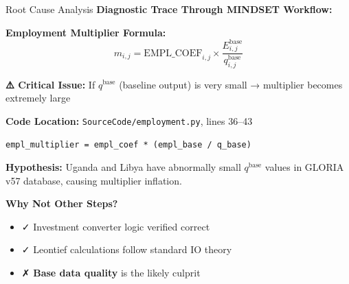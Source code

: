 \documentclass[10pt]{beamer}
\begin{document}
\begin{frame}{Root Cause Analysis}
\textbf{Diagnostic Trace Through MINDSET Workflow:}

\vspace{0.3cm}

\textbf{Employment Multiplier Formula:}
\[
m_{i,j} = \text{EMPL\_COEF}_{i,j} \times \frac{E^{\text{base}}_{i,j}}{q^{\text{base}}_{i,j}}
\]

\vspace{0.3cm}

\textbf{⚠️ Critical Issue:} If $q^{\text{base}}$ (baseline output) is very small → multiplier becomes extremely large

\vspace{0.5cm}

\textbf{Code Location:} \texttt{SourceCode/employment.py}, lines 36--43

\vspace{0.2cm}

{\small
\texttt{empl\_multiplier = empl\_coef * (empl\_base / q\_base)}
}

\vspace{0.5cm}

\textbf{Hypothesis:} Uganda and Libya have abnormally small $q^{\text{base}}$ values in GLORIA v57 database, causing multiplier inflation.

\vspace{0.3cm}

\textbf{Why Not Other Steps?}
\begin{itemize}
    \item ✓ Investment converter logic verified correct
    \item ✓ Leontief calculations follow standard IO theory
    \item ✗ \textbf{Base data quality} is the likely culprit
\end{itemize}
\end{frame}
\end{document}
